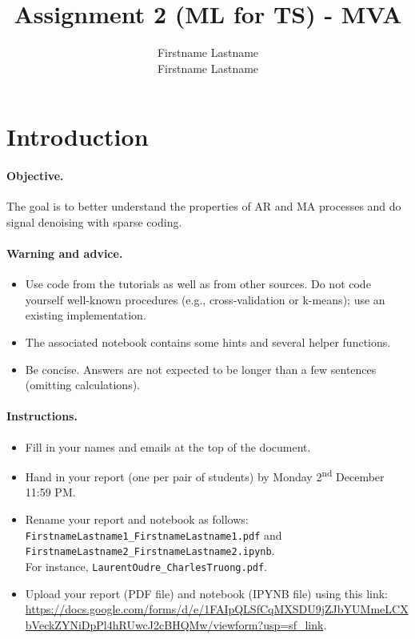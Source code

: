\documentclass[11pt]{article}
\title{Assignment 2 (ML for TS) - MVA}
\author{
Firstname Lastname \email{youremail1@mail.com} \\ %
Firstname Lastname \email{youremail2@mail.com} %
}
\begin{document}
\maketitle

\section{Introduction}

\paragraph{Objective.} The goal is to better understand the properties of AR and MA processes and do signal denoising with sparse coding.

\paragraph{Warning and advice.} 
\begin{itemize}
    \item Use code from the tutorials as well as from other sources. Do not code yourself well-known procedures (e.g., cross-validation or k-means); use an existing implementation. 
    \item The associated notebook contains some hints and several helper functions.
    \item Be concise. Answers are not expected to be longer than a few sentences (omitting calculations).
\end{itemize}



\paragraph{Instructions.}
\begin{itemize}
    \item Fill in your names and emails at the top of the document.
    \item Hand in your report (one per pair of students) by Monday 2\textsuperscript{nd} December 11:59 PM.
    \item Rename your report and notebook as follows:\\ \texttt{FirstnameLastname1\_FirstnameLastname1.pdf} and\\ \texttt{FirstnameLastname2\_FirstnameLastname2.ipynb}.\\
    For instance, \texttt{LaurentOudre\_CharlesTruong.pdf}.
    \item Upload your report (PDF file) and notebook (IPYNB file) using this link: \href{https://docs.google.com/forms/d/e/1FAIpQLSfCqMXSDU9jZJbYUMmeLCXbVeckZYNiDpPl4hRUwcJ2cBHQMw/viewform?usp=sf_link}{https://docs.google.com/forms/d/e/1FAIpQLSfCqMXSDU9jZJbYUMmeLCXbVeckZYNiDpPl4hRUwcJ2cBHQMw/viewform?usp=sf\_link}.
\end{itemize}
\end{document}
